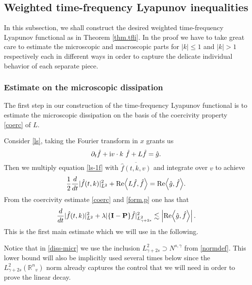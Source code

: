 \documentclass{amsart}
\numberwithin{equation}{section}
\begin{document}
\subsection{Weighted time-frequency Lyapunov inequalities}\label{sec.sub.tfli}
In this subsection, we shall construct the desired weighted time-frequency
Lyapunov functional as in Theorem \ref{thm.tfli}.  In the proof we have to take great care to estimate the microscopic and macroscopic parts for $|k| \le 1$ and $|k| > 1$ respectively each in different ways in order to capture the delicate individual behavior of each separate piece.

\subsubsection{Estimate on the microscopic dissipation}

The first step in our construction of the time-frequency Lyapunov
functional is to estimate the microscopic dissipation on the basis of the
coercivity property \eqref{coerc} of ${L}$. 

Consider  \eqref{ls}, taking the Fourier transform in $x$ grants us
\begin{equation}\label{ls-1f}
  {\displaystyle}     {\partial}_t \hat{f}+{{\rm i}}{v}\cdot k ~ \hat{f}+{L} \hat{f} =\hat{g}.
\end{equation}
Then we multiply equation \eqref{ls-1f} with $\overline{\hat{f}(t,k,{v})}$ and integrate over ${v}$ to achieve  
\begin{equation}
\notag
    \frac{1}{2}\frac{d}{dt} {|}\hat{f}(t,k){|}_{L^2}^2+{{\rm Re}} { \left< {{{L} \hat{f}, \hat{f} }} \right> }
    ={{\rm Re}} { \left< {{\hat{g}, \hat{f}}} \right> }.
\end{equation}
From the coercivity estimate \eqref{coerc} and \eqref{form.p} one has that
\begin{equation}\label{diss-micr}
\frac{d}{dt} {|}\hat{f}(t,k){|}_{L^2}^2
+
{\lambda} {|} \{{\mathbf{I}}-{\mathbf{P}}\} \hat{f}{|}_{L^2_{\gamma+2s}}^2
\lesssim
\left|  {{\rm Re}} { \left< {{\hat{g}, \hat{f}}} \right> } \right|.
\end{equation}
This is the first main estimate which we will use in the following.

Notice that in \eqref{diss-micr} we use the inclusion $L^2_{\gamma+2s} \supset {N^{s,\gamma}}$ from \eqref{normdef}.  This lower bound will also be implicitly used several times below since the $L^2_{\gamma+2s}({{\mathbb R}^{n}}_v)$ norm already captures the control that we will need in order to prove the linear decay.
\end{document}
